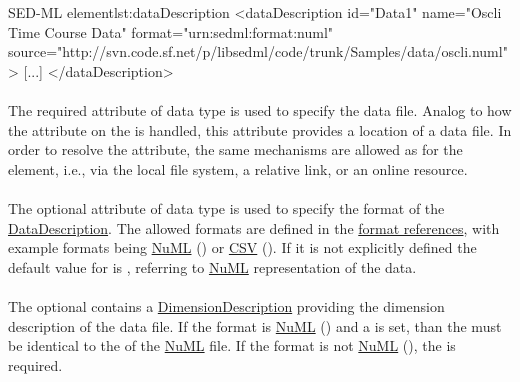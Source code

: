 \begin{myXmlLst}{SED-ML  element}{lst:dataDescription}
<dataDescription id="Data1" name="Oscli Time Course Data" format="urn:sedml:format:numl"
	source="http://svn.code.sf.net/p/libsedml/code/trunk/Samples/data/oscli.numl" >
    [...]
</dataDescription>
\end{myXmlLst} 

\paragraph*{}
\label{sec:data_source}
The required  attribute of data type \hyperref[type:anyURI]{} is used to specify the data file. Analog to how the \hyperref[sec:model_source]{} attribute on the \SedModel is handled, this attribute provides a location of a data file. In order to resolve the  attribute, the same mechanisms are allowed as for the \SedModel \hyperref[sec:model_source]{} element, i.e., via the local file system, a relative link, or an online resource.

\paragraph*{}
\label{sec:format}
The optional  attribute of data type \hyperref[type:anyURI]{} is used to specify the format of the \hyperref[class:dataDescription]{DataDescription}. The allowed formats are defined in the \hyperref[sec:dataFormatURI]{format references}, with example formats being \hyperref[sec:dataFormatNUML]{NuML} () or \hyperref[sec:dataFormatCSV]{CSV} (). If it is not explicitly defined the default value for  is , referring to \hyperref[sec:dataFormatNUML]{NuML} representation of the data.

\paragraph*{}
\label{sec:dimensionDescription}
The optional  contains a \hyperref[class:dimensionDescription]{DimensionDescription} providing the dimension description of the data file. If the format is \hyperref[sec:dataFormatNUML]{NuML} () and a  is set, than the  must be identical to the  of the \hyperref[sec:dataFormatNUML]{NuML} file. If the format is not \hyperref[sec:dataFormatNUML]{NuML} (), the  is required.

